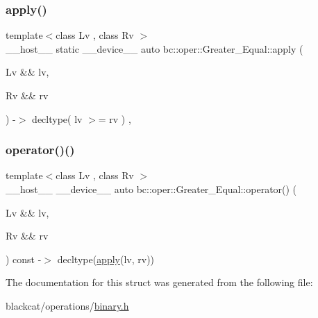 \subsubsection{\texorpdfstring{apply()}{apply()}}
{\footnotesize\ttfamily template$<$class Lv , class Rv $>$ \\
\+\_\+\+\_\+host\+\_\+\+\_\+ static \+\_\+\+\_\+device\+\_\+\+\_\+ auto bc\+::oper\+::\+Greater\+\_\+\+Equal\+::apply (\begin{DoxyParamCaption}\item[{Lv \&\&}]{lv,  }\item[{Rv \&\&}]{rv }\end{DoxyParamCaption}) -\/$>$ decltype( lv $>$= rv ) \hspace{0.3cm}{\ttfamily [inline]}, {\ttfamily [static]}}

\mbox{\label{structbc_1_1oper_1_1Greater__Equal_a6b756064469789a4413c5f114c4b20a1}} 
\subsubsection{\texorpdfstring{operator()()}{operator()()}}
{\footnotesize\ttfamily template$<$class Lv , class Rv $>$ \\
\+\_\+\+\_\+host\+\_\+\+\_\+ \+\_\+\+\_\+device\+\_\+\+\_\+ auto bc\+::oper\+::\+Greater\+\_\+\+Equal\+::operator() (\begin{DoxyParamCaption}\item[{Lv \&\&}]{lv,  }\item[{Rv \&\&}]{rv }\end{DoxyParamCaption}) const -\/$>$ decltype(\hyperlink{structbc_1_1oper_1_1Greater__Equal_aad0b6466718adb499ff41255b9e1b1fa}{apply}(lv, rv)) \hspace{0.3cm}{\ttfamily [inline]}}



The documentation for this struct was generated from the following file\+:\begin{DoxyCompactItemize}
\item 
blackcat/operations/\hyperlink{binary_8h}{binary.\+h}\end{DoxyCompactItemize}
